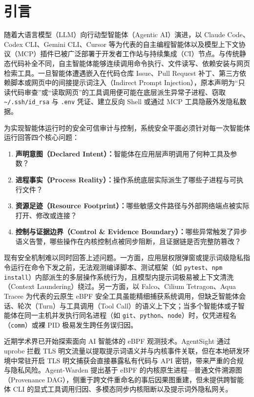 \documentclass[UTF8,a4paper,zihao=-4,twocolumn]{ctexart}
\newcommand{\code}[1]{\texttt{\small #1}}
\begin{document}
\section{引言}
随着大语言模型（LLM）向行动型智能体（Agentic AI）演进，以 Claude Code、Codex CLI、Gemini CLI、Cursor 等为代表的自主编程智能体以及模型上下文协议（MCP）插件已被广泛部署于开发者工作站与持续集成（CI）节点。与传统静态代码补全不同，自主智能体能够连续调用命令执行、文件读写、依赖安装与网页检索工具。一旦智能体遭遇嵌入在代码仓库 Issue、Pull Request 补丁、第三方依赖脚本或网页中的间接提示词注入（Indirect Prompt Injection），原本声明为“只读代码审查”或“读取网页”的工具调用便可能在底层派生异常子进程、窃取 \code{\textasciitilde/.ssh/id\_rsa} 与 \code{.env} 凭证、建立反向 Shell 或通过 MCP 工具隐蔽外发隐私数据\cite{sope2026,flowseal2026,privacypeek2026}。

为实现智能体运行时的安全可信审计与控制，系统安全平面必须针对每一次智能体运行回答四个核心问题：
\begin{enumerate}[label=(\arabic*)]
  \item \textbf{声明意图（Declared Intent）：}智能体在应用层声明调用了何种工具及参数？
  \item \textbf{进程事实（Process Reality）：}操作系统底层实际派生了哪些子进程与可执行文件？
  \item \textbf{资源足迹（Resource Footprint）：}哪些敏感文件路径与外部网络端点被实际打开、修改或连接？
  \item \textbf{控制与证据边界（Control \& Evidence Boundary）：}哪些异常触发了异步语义告警，哪些操作在内核控制点被同步阻断，且证据链是否完整防篡改？
\end{enumerate}

现有安全机制难以同时回答上述问题。一方面，应用层权限弹窗或提示词级隐私指令运行在命令下发之前，无法观测编译脚本、测试框架（如 \code{pytest}、\code{npm install}）内部派生的多层操作系统行为，且模型内提示词极易被上下文清洗（Context Laundering）绕过\cite{flowseal2026}。另一方面，以 Falco\cite{falco}、Cilium Tetragon\cite{tetragon}、Aqua Tracee\cite{tracee} 为代表的云原生 eBPF 安全工具虽能精细捕获系统调用，但缺乏智能体会话、轮次（Turn）与工具调用（Tool Call）的语义上下文；当多个智能体或子智能体在同一主机并发执行同名进程（如 \code{git}、\code{python}、\code{node}）时，仅凭进程名（\code{comm}）或裸 PID 极易发生跨任务误归因。

近期学术界已开始探索面向 AI 智能体的 eBPF 观测技术。AgentSight\cite{agentsight2025} 通过 uprobe 拦截 TLS 明文流量以提取提示词语义并与内核事件关联，但在本地研发环境中常驻开启 TLS 明文捕获会直接暴露私有代码与 API 密钥，带来严重的合规与隐私风险。Agent-Warden\cite{agentwarden2026} 提出基于 eBPF 的内核原生进程—普通文件溯源图（Provenance DAG），侧重于跨文件重命名的事后因果图重建，但未提供跨智能体 CLI 的显式工具调用归因、多模态同步内核阻断以及提示词外隐私网关。
\end{document}
